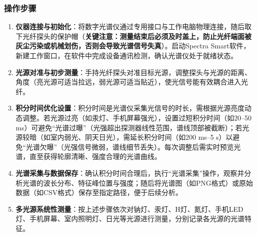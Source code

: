 \documentclass[11pt]{article}
\begin{document}
\subsubsection{操作步骤}
\begin{enumerate}
    \item \textbf{仪器连接与初始化}：将数字光谱仪通过专用接口与工作电脑物理连接，随后取下光纤探头的保护帽（\textbf{关键注意：测量结束后必须及时盖上，防止光纤端面被灰尘污染或机械划伤，否则会导致光谱信号失真}）。启动Spectra Smart软件，新建工作窗口，在软件中完成设备通讯检测，确认光谱仪处于就绪状态。
    \item \textbf{光源对准与初步测量}：手持光纤探头对准目标光源，调整探头与光源的距离、角度（亮光源可适当拉远，弱光源可适当贴近），使光信号能有效耦合进入光纤。
    \item \textbf{积分时间优化设置}：积分时间是光谱仪采集光信号的时长，需根据光源亮度动态调整。若光源过亮（如汞灯、手机屏幕强光），设置过短积分时间（如20–50 ms）可避免“光谱过曝”（光强超出探测器线性范围，谱线顶部被截断）；若光源较暗（如室内弱光、阴天日光），需延长积分时间（如200 ms–5 s）以避免“光谱欠曝”（光强信号微弱，谱线细节丢失）。每次调整后需实时预览光谱，直至获得轮廓清晰、强度合理的光谱曲线。
    \item \textbf{光谱采集与数据保存}：确认积分时间合理后，执行“光谱采集”操作，观察并分析光谱的波长分布、特征峰位置与强度；随后将光谱图（如PNG格式）或原始数据（如CSV格式）保存至指定路径，便于后续分析。
    \item \textbf{多光源系统性测量}：按上述步骤依次对钠灯、汞灯、H灯、氮灯、手机LED灯、手机屏幕、室内照明灯、日光等光源进行测量，分别记录各光源的光谱特征。
\end{enumerate}
\end{document}
